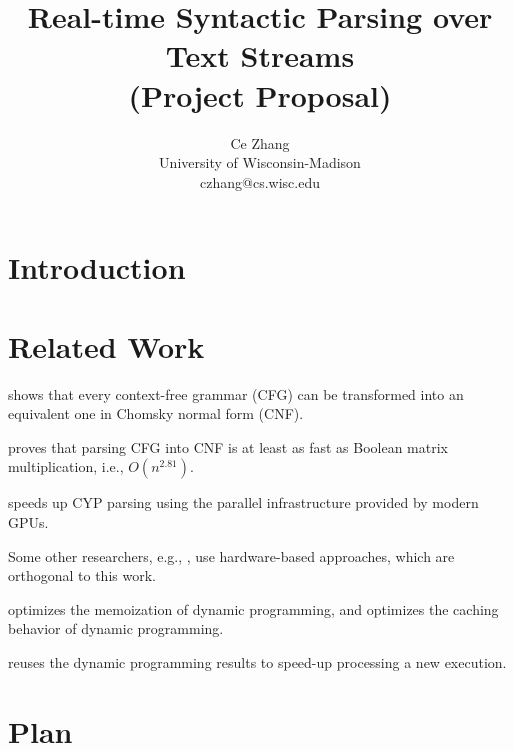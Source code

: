 \documentclass{article}
\title{Real-time Syntactic Parsing over Text Streams\\(Project Proposal)}
\author{Ce Zhang\\University of Wisconsin-Madison\\czhang@cs.wisc.edu}
\begin{document}
\maketitle

\section{Introduction}

\section{Related Work}

 shows that every context-free grammar (CFG) can be
transformed into an equivalent one in Chomsky normal form (CNF).

 proves that parsing CFG into CNF is at
least as fast as Boolean matrix multiplication, i.e., $O(n^{2.81})$.

 speeds up CYP parsing using the parallel
infrastructure provided by modern GPUs.

Some other researchers, e.g., , use
hardware-based approaches, which are orthogonal to this work. 

 optimizes the memoization of dynamic
programming, and  optimizes the caching
behavior of dynamic programming.

\cite{hong:2009:tcbb} reuses the dynamic programming results to
speed-up processing a new execution.

\section{Plan}




\end{document}
